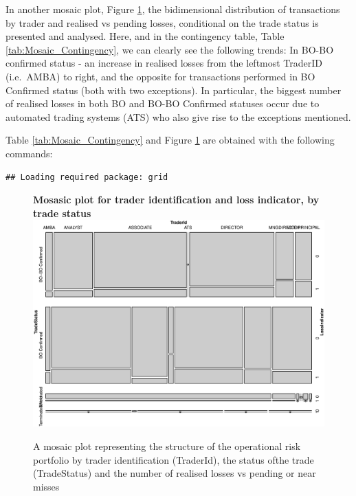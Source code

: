 \documentclass[]{article}
\begin{document}
In another mosaic plot, Figure \ref{Mosaic_Contingency}, the
bidimensional distribution of transactions by trader and realised vs
pending losses, conditional on the trade status is presented and
analysed. Here, and in the contingency table, Table
\ref{tab:Mosaic_Contingency}, we can clearly see the following trends:
In BO-BO confirmed status - an increase in realised losses from the
leftmost TraderID (i.e.~AMBA) to right, and the opposite for
transactions performed in BO Confirmed status (both with two
exceptions). In particular, the biggest number of realised losses in
both BO and BO-BO Confirmed statuses occur due to automated trading
systems (ATS) who also give rise to the exceptions mentioned.\medskip

Table \ref{tab:Mosaic_Contingency} and Figure \ref{Mosaic_Contingency}
are obtained with the following commands:

\singlespacing

\begin{verbatim}
## Loading required package: grid
\end{verbatim}

\singlespacing
\begin{figure}
\centering
\textbf{Mosasic plot for trader identification and loss indicator, by trade status}
\includegraphics[width=\linewidth,height=0.75\linewidth]{Mosaic_Contingency.eps}
\caption[Portfolio structure by trader, trade status and number of realised losses]{A mosaic plot representing the structure of the operational risk portfolio by trader identification (TraderId), the status ofthe trade (TradeStatus) and the number of realised losses vs pending or near misses}
\label{Mosaic_Contingency}
\end{figure}
\doublespacing
\end{document}
